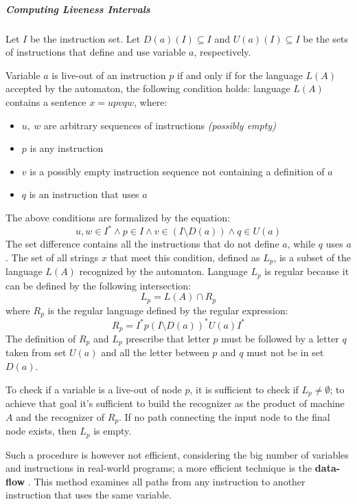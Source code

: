 \documentclass[english]{article}
\begin{document}
\subparagraph*{Computing Liveness Intervals}

Let \(I\) be the instruction set.
Let \(D(a)(I) \subseteq I\) and \(U(a)(I) \subseteq I\) be the sets of instructions that define and use variable \(a\), respectively.

Variable \(a\) is live-out of an instruction \(p\) if and only if for the language \(L(A)\) accepted by the automaton, the following condition holds:
language \(L(A)\) contains a sentence \(x = u p v q w\), where:
\begin{itemize}
  \item \(u, \ w\) are arbitrary sequences of instructions \textit{(possibly empty)}
  \item \(p\) is any instruction
  \item \(v\) is a possibly empty instruction sequence not containing a definition of \(a\)
  \item \(q\) is an instruction that uses \(a\)
\end{itemize}

The above conditions are formalized by the equation:
\[ u, w \in I^\ast \land p \in I \land v \in \left( I \setminus D\left( a \right) \right) \land q \in U\left( a \right) \]
The set difference contains all the instructions that do not define \(a\), while \(q\) uses \(a\).
The set of all strings \(x\) that meet this condition, defined as \(L_p\), is a subset of the language \(L(A)\) recognized by the automaton.
Language \(L_p\) is regular because it can be defined by the following intersection:
\[ L_p = L(A) \cap R_p \]
where \(R_p\) is the regular language defined by the regular expression:
\[ R_p = I^\ast p \left( I \setminus D \left( a \right) \right)^\ast U \left( a \right) I^\ast \]
The definition of \(R_p\) and \(L_p\) prescribe that letter \(p\) must be followed by a letter \(q\) taken from set \(U\left( a \right)\)  and all the letter between \(p\) and \(q\) must not be in set \(D\left( a \right)\).

To check if a variable is a live-out of node \(p\), it is sufficient to check if \(L_p \neq \emptyset\);
to achieve that goal it's sufficient to build the recognizer as the product of machine \(A\) and the recognizer of \(R_p\).
If no path connecting the input node to the final node exists, then \(L_p\) is empty.

Such a procedure is however not efficient, considering the big number of variables and instructions in real-world programs;
a more efficient technique is the \textbf{data-flow }.
This method examines all paths from any instruction to another instruction that uses the same variable.
\end{document}
